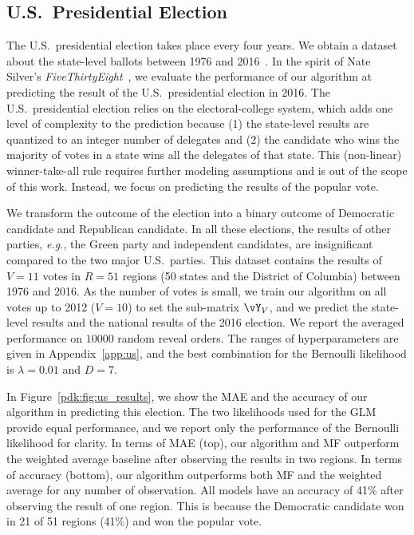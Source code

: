 \subsection{U.S.\ Presidential Election}

The U.S.\ presidential election takes place every four years.
We obtain a dataset about the state-level ballots between 1976 and 2016~\citep{mit2017us}.
In the spirit of Nate Silver's \textit{FiveThirtyEight}~\citep{silver2008pollster}, we evaluate the performance of our algorithm at predicting the result of the U.S.\ presidential election in 2016.
The U.S.\ presidential election relies on the electoral-college system, which adds one level of complexity to the prediction because (1) the state-level results are quantized to an integer number of delegates and (2) the candidate who wins the majority of votes in a state wins all the delegates of that state.
This (non-linear) winner-take-all rule requires further modeling assumptions and is out of the scope of this work.
Instead, we focus on predicting the results of the popular vote.

We transform the outcome of the election into a binary outcome of Democratic candidate and Republican candidate.
In all these elections, the results of other parties, \textit{e.g.}, the Green party and independent candidates, are insignificant compared to the two major U.S.\ parties.
This dataset contains the results of $V = 11$ votes in $R = 51$ regions (50 states and the District of Columbia) between 1976 and 2016.
As the number of votes is small, we train our algorithm on all votes up to 2012 ($V = 10$) to set the sub-matrix $\vY_V$, and we predict the state-level results and the national results of the 2016 election.
We report the averaged performance on $10000$ random reveal orders.
The ranges of hyperparameters are given in Appendix~\ref{app:us}, and the best combination for the Bernoulli likelihood is $\lambda = 0.01 $ and $D = 7$.

In Figure~\ref{pdk:fig:us_results}, we show the MAE and the accuracy of our algorithm in predicting this election.
The two likelihoods used for the GLM provide equal performance, and we report only the performance of the Bernoulli likelihood for clarity.
In terms of MAE (top), our algorithm and MF outperform the weighted average baseline after observing the results in two regions.
In terms of accuracy (bottom), our algorithm outperforms both MF and the weighted average for any number of observation.
All models have an accuracy of 41\% after observing the result of one region.
This is because the Democratic candidate won in 21 of 51 regions (41\%) and won the popular vote.

